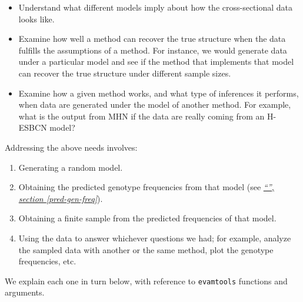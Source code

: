 \documentclass[a4paper,11pt]{article}
\newcommand*{\qrefP}[1]{\hyperref[{#1}]{\textit{``\nameref*{#1}'', section \ref*{#1}}}}
\begin{document}
\begin{itemize}
\item Understand what different models imply about how the cross-sectional data looks like.

\item Examine how well a method can recover the true structure when the data fulfills the assumptions of a method. For instance, we would generate data under a particular model and see if the method that implements that model can recover the true structure under different sample sizes.

\item Examine how a given method works, and what type of inferences it performs, when data are generated under the model of another method. For example, what is the output from MHN if the data are really coming from an H-ESBCN model?
\end{itemize}


Addressing the above needs involves:


\begin{enumerate}
\item Generating a random model.
 
\item Obtaining the predicted genotype frequencies from that model (see \qrefP{pred-gen-freq}).
 
\item Obtaining a finite sample from the predicted frequencies of that model.
  
\item Using the data to answer whichever questions we had; for example, analyze the sampled data with another or the same method, plot the genotype frequencies, etc.
  
\end{enumerate}



We explain each one in turn below, with reference to \texttt{evamtools} functions and arguments.
\end{document}
